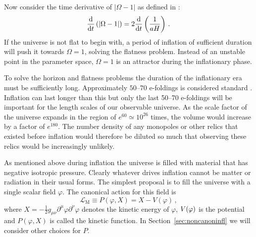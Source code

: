 Now consider the time derivative of $|\Omega -1|$ as defined in
:
% 
\begin{equation}
 \label{eq:omegaderiv-intro}
 \frac{\mathrm{d}}{\mathrm{d} t}\left(|\Omega -1 |\right) = 2\frac{\mathrm{d}}{\mathrm{d} t}
\left(\frac{1}{aH}\right)\,.
\end{equation}
% 
If the universe is not flat to begin with, a period of inflation of sufficient
duration will push it
towards $\Omega=1$, solving the flatness problem. Instead of an unstable point
in the parameter space, $\Omega=1$ is an attractor during the inflationary
phase. 
% 

To solve the horizon and flatness problems the duration of the inflationary era
must be
sufficiently long. Approximately $50$--$70$ e-foldings is considered standard
\cite{book:liddle}. Inflation
can last longer than this but only the last 50--70 e-foldings will be important
for the length scales of our observable universe. As the scale factor of the
universe expands
in the region of $e^{60}\simeq 10^{26}$ times, the volume would increase by a
factor of $e^{180}$.  The number density
of any monopoles or other relics that existed before inflation would therefore be
diluted so much that observing these relics would be increasingly unlikely. 


As mentioned above during inflation the universe is filled with material that
has negative isotropic pressure.
Clearly whatever drives inflation cannot be matter or radiation in their usual
forms. The simplest proposal is to fill the universe with a single scalar field
$\varphi$. The canonical action for this field is
\begin{equation}
\label{eq:phiaction-intro}
 \mathcal{L}_\mathrm{M} \equiv P(\varphi, X) = X -V(\varphi) \,,
\end{equation}
where $X=-\frac{1}{2}g_{\mu\nu}\partial^\mu\varphi \partial^\nu\varphi$ denotes
the kinetic energy of $\varphi$, $V(\varphi)$ is the potential and $P(\varphi, X)$
is called the kinetic
function. In Section~\ref{sec:noncanoninfl} we will consider other
choices for $P$. 


